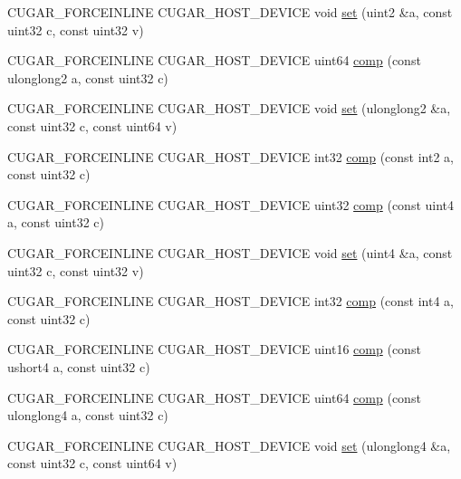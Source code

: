 \begin{DoxyCompactItemize}
\item 
C\+U\+G\+A\+R\+\_\+\+F\+O\+R\+C\+E\+I\+N\+L\+I\+NE C\+U\+G\+A\+R\+\_\+\+H\+O\+S\+T\+\_\+\+D\+E\+V\+I\+CE void \hyperlink{group___basic_gab1b928f43d089426870dc0afd011395c}{set} (uint2 \&a, const uint32 c, const uint32 v)
\item 
C\+U\+G\+A\+R\+\_\+\+F\+O\+R\+C\+E\+I\+N\+L\+I\+NE C\+U\+G\+A\+R\+\_\+\+H\+O\+S\+T\+\_\+\+D\+E\+V\+I\+CE uint64 \hyperlink{group___basic_ga82749940d0c34c292e2761ecf2c3f1e3}{comp} (const ulonglong2 a, const uint32 c)
\item 
C\+U\+G\+A\+R\+\_\+\+F\+O\+R\+C\+E\+I\+N\+L\+I\+NE C\+U\+G\+A\+R\+\_\+\+H\+O\+S\+T\+\_\+\+D\+E\+V\+I\+CE void \hyperlink{group___basic_gabe33a8750c36216a280b69f972f662c5}{set} (ulonglong2 \&a, const uint32 c, const uint64 v)
\item 
C\+U\+G\+A\+R\+\_\+\+F\+O\+R\+C\+E\+I\+N\+L\+I\+NE C\+U\+G\+A\+R\+\_\+\+H\+O\+S\+T\+\_\+\+D\+E\+V\+I\+CE int32 \hyperlink{group___basic_gab9628292c5eb84f4597f8e345b79cba2}{comp} (const int2 a, const uint32 c)
\item 
C\+U\+G\+A\+R\+\_\+\+F\+O\+R\+C\+E\+I\+N\+L\+I\+NE C\+U\+G\+A\+R\+\_\+\+H\+O\+S\+T\+\_\+\+D\+E\+V\+I\+CE uint32 \hyperlink{group___basic_ga5545f19d89c4e61611468d6bd1060a0f}{comp} (const uint4 a, const uint32 c)
\item 
C\+U\+G\+A\+R\+\_\+\+F\+O\+R\+C\+E\+I\+N\+L\+I\+NE C\+U\+G\+A\+R\+\_\+\+H\+O\+S\+T\+\_\+\+D\+E\+V\+I\+CE void \hyperlink{group___basic_ga02d9003c4a4c31d671a38739bdbd223b}{set} (uint4 \&a, const uint32 c, const uint32 v)
\item 
C\+U\+G\+A\+R\+\_\+\+F\+O\+R\+C\+E\+I\+N\+L\+I\+NE C\+U\+G\+A\+R\+\_\+\+H\+O\+S\+T\+\_\+\+D\+E\+V\+I\+CE int32 \hyperlink{group___basic_gaae11b617c4d4f21b97ed354dbe09d947}{comp} (const int4 a, const uint32 c)
\item 
C\+U\+G\+A\+R\+\_\+\+F\+O\+R\+C\+E\+I\+N\+L\+I\+NE C\+U\+G\+A\+R\+\_\+\+H\+O\+S\+T\+\_\+\+D\+E\+V\+I\+CE uint16 \hyperlink{group___basic_ga2d4381782c0e35e5b62cad80edbadb97}{comp} (const ushort4 a, const uint32 c)
\item 
C\+U\+G\+A\+R\+\_\+\+F\+O\+R\+C\+E\+I\+N\+L\+I\+NE C\+U\+G\+A\+R\+\_\+\+H\+O\+S\+T\+\_\+\+D\+E\+V\+I\+CE uint64 \hyperlink{group___basic_ga47d97ac7d761e3b3764fedb8bab6ad8d}{comp} (const ulonglong4 a, const uint32 c)
\item 
C\+U\+G\+A\+R\+\_\+\+F\+O\+R\+C\+E\+I\+N\+L\+I\+NE C\+U\+G\+A\+R\+\_\+\+H\+O\+S\+T\+\_\+\+D\+E\+V\+I\+CE void \hyperlink{group___basic_gac0bd2f6d0e83bfeddcd301d63e0bc750}{set} (ulonglong4 \&a, const uint32 c, const uint64 v)

\end{DoxyCompactItemize}
